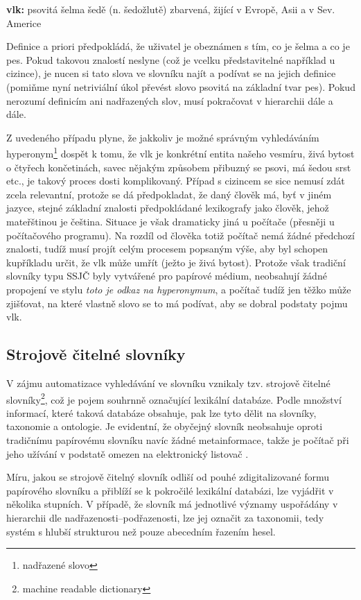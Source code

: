 \documentclass[a4paper, 11pt, oneside]{book}
\newcommand\ex{\textsf}
\begin{document}
				\bigskip
				\ex{\textbf{vlk: } psovitá šelma šedě (n. šedožlutě) zbarvená, žijící v Evropě, Asii a v Sev. Americe}
				\bigskip

				Definice a priori předpokládá, že uživatel je obeznámen s tím, co je \ex{šelma} a co je \ex{pes}. Pokud takovou znalostí neslyne (což je vcelku představitelné například u cizince), je nucen si tato slova ve slovníku najít a podívat se na jejich definice (pomiňme nyní netriviální úkol převést slovo \ex{psovitá} na základní tvar \ex{pes}). Pokud nerozumí definicím ani nadřazených slov, musí pokračovat v hierarchii dále a dále. 

				Z uvedeného případu plyne, že jakkoliv je možné správným vyhledáváním hyperonym\footnote{nadřazené slovo} dospět k tomu, že \ex{vlk} je konkrétní entita našeho vesmíru, živá bytost o čtyřech končetinách, savec nějakým způsobem přibuzný se psovi, má šedou srst etc., je takový proces dosti komplikovaný. Případ s cizincem se sice nemusí zdát zcela relevantní, protože se dá předpokladat, že daný člověk má, byť v jiném jazyce, stejné základní znalosti předpokládané lexikografy jako člověk, jehož mateřštinou je čeština. Situace je však dramaticky jiná u počítače (přesněji u počítačového programu). Na rozdíl od člověka totiž počítač nemá žádné předchozí znalosti, tudíž musí projít celým procesem popsaným výše, aby byl schopen kupříkladu určit, že \ex{vlk} může umřít (ježto je živá bytost). Protože však tradiční slovníky typu SSJČ byly vytvářené pro papírové médium, neobsahují žádné propojení ve stylu \textit{toto je odkaz na hyperonymum}, a počítač tudíž jen těžko může zjišťovat, na které vlastně slovo se to má podívat, aby se dobral podstaty pojmu \ex{vlk}.

				\subsection{Strojově čitelné slovníky}

					V zájmu automatizace vyhledávání ve slovníku vznikaly tzv. strojově čitelné slovníky\footnote{machine readable dictionary}, což je pojem souhrnně označující lexikální databáze. Podle množství informací, které taková databáze obsahuje, pak lze tyto dělit na slovníky, taxonomie a ontologie. Je evidentní, že obyčejný slovník neobsahuje oproti tradičnímu papírovému slovníku navíc žádné metainformace, takže je počítač při jeho užívání v podstatě omezen na elektronický listovač \parencite{miller1990introduction}. 

					Míru, jakou se strojově čitelný slovník odliší od pouhé zdigitalizované formu papírového slovníku a přiblíží se k pokročilé lexikální databázi, lze vyjádřit v několika stupních. V případě, že slovník má jednotlivé významy uspořádány v hierarchii dle nadřazenosti--podřazenosti, lze jej označit za taxonomii, tedy systém s hlubší strukturou než pouze abecedním řazením hesel. 
\end{document}
